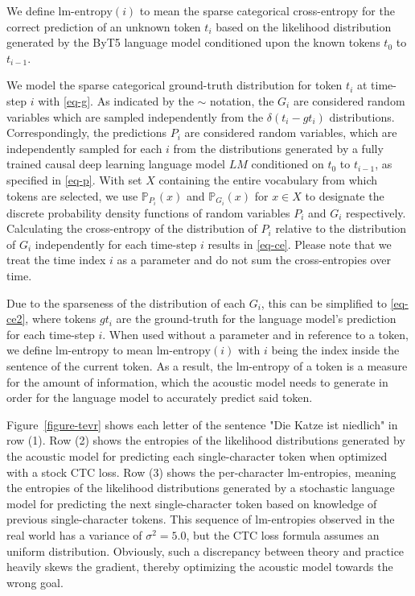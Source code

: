 We define $\text{lm-entropy}(i)$ to mean the sparse categorical cross-entropy for the correct prediction of an unknown token $t_i$ based on the likelihood distribution generated by the ByT5 language model conditioned upon the known tokens $t_0$ to $t_{i-1}$. 

We model the sparse categorical ground-truth distribution for token $ t_i $ at time-step $i$ with \autoref{eq-g}. 
As indicated by the $\sim$ notation, the $G_i$ are considered random variables which are sampled independently from the $\delta(t_i-gt_i)$ distributions.
Correspondingly, the predictions $P_i$ are considered random variables, which are independently sampled for each $i$ from the distributions generated by a fully trained causal deep learning language model $ LM $ conditioned on $t_0$ to $t_{i-1}$, as specified in \autoref{eq-p}.
With set $X$ containing the entire vocabulary from which tokens are selected, we use $\mathbb{P}_{P_i}(x)$ and $\mathbb{P}_{G_i}(x)$ for $x \in X$ to designate the discrete probability density functions of random variables $P_i$ and $G_i$ respectively.
Calculating the cross-entropy of the distribution of $P_i$ relative to the distribution of $G_i$ independently for each time-step $i$ results in \autoref{eq-ce}. Please note that we treat the time index $i$ as a parameter and do not sum the cross-entropies over time.

Due to the sparseness of the distribution of each $G_i$, this can be simplified to \autoref{eq-ce2}, where tokens $gt_i$ are the ground-truth for the language model's prediction for each time-step $i$.
When used without a parameter and in reference to a token, we define lm-entropy to mean $ \text{lm-entropy}(i) $ with $i$ being the index inside the sentence of the current token.
As a result, the lm-entropy of a token is a measure for the amount of information, which the acoustic model needs to generate in order for the language model to accurately predict said token.

Figure~\ref{figure-tevr} shows each letter of the sentence "Die Katze ist niedlich" in row (1). 
Row (2) shows the entropies of the likelihood distributions generated by the acoustic model for predicting each single-character token when optimized with a stock CTC loss. 
Row (3) shows the per-character lm-entropies, meaning the entropies of the likelihood distributions generated by a stochastic language model for predicting the next single-character token based on knowledge of previous single-character tokens. 
This sequence of lm-entropies observed in the real world has a variance of $\sigma^2=5.0$,
but the CTC loss formula assumes an uniform distribution. 
Obviously, such a discrepancy between theory and practice heavily skews the gradient, thereby optimizing the acoustic model towards the wrong goal.

